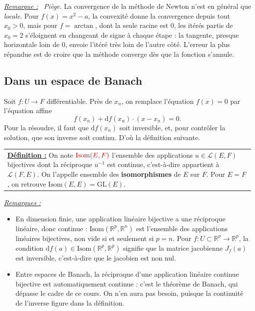 \documentclass[a4paper,twoside]{report}
\newcommand{\mot}[1]{\textcolor{rougecours}{\textbf{#1}}}
\newcommand{\rmath}[1]{\textcolor{rougecours}{#1}}
\newenvironment{remarque}%
 {\par\needspace{6\baselineskip}\vspace{1mm}\begin{list}{}{\leftmargin=1cm \rightmargin=0.5cm}\item[]%
  \textit{\underline{Remarque :}}~}%
 {\end{list}\vspace{1mm}}
\newenvironment{remarques}%
 {\par\needspace{6\baselineskip}\vspace{1mm}\begin{list}{}{\leftmargin=1cm \rightmargin=0.5cm}\item[]%
  \textit{\underline{Remarques :}}%
  \begin{itemize}[label=$\bullet$,leftmargin=0.45cm,topsep=3pt,itemsep=4pt]}%
 {\end{itemize}\end{list}\vspace{1mm}}
\newcommand{\R}{\mathbb{R}}
\newcommand{\dd}{\mathrm{d}}                      %
\newcommand{\GL}{\mathrm{GL}}                     %
\newcommand{\Lc}{\mathcal{L}}                     %
\newcommand{\Isom}{\mathrm{Isom}}                 %
\newcommand{\Jac}{J}                              %
\begin{document}
\begin{remarque}
\emph{Piège.} La convergence de la méthode de Newton n'est en général que \emph{locale}. Pour $f(x) = x^{2} - a$, la convexité donne la convergence depuis tout $x_{0} > 0$, mais pour $f = \arctan$, dont la seule racine est $0$, les itérés partis de $x_{0} = 2$ s'éloignent en changeant de signe à chaque étape : la tangente, presque horizontale loin de $0$, envoie l'itéré très loin de l'autre côté. L'erreur la plus répandue est de croire que la méthode converge dès que la fonction s'annule.
\end{remarque}

\subsection{Dans un espace de Banach}

Soit $f : U \to F$ différentiable. Près de $x_{n}$, on remplace l'équation $f(x) = 0$ par l'équation affine
\[ f(x_{n}) + \dd f(x_{n})\cdot(x - x_{n}) = 0. \]
Pour la résoudre, il faut que $\dd f(x_{n})$ soit inversible, et, pour contrôler la solution, que son inverse soit continu. D'où la définition suivante.

\begin{center}
\begin{tabularx}{15cm}{||X}
\noindent \textbf{\underline{Définition :}} On note $\rmath{\Isom(E, F)}$ l'ensemble des applications $u \in \Lc(E, F)$ bijectives dont la réciproque $u^{-1}$ est continue, c'est-à-dire appartient à $\Lc(F, E)$. On l'appelle ensemble des \mot{isomorphismes} de $E$ sur $F$. Pour $E = F$, on retrouve $\Isom(E, E) = \GL(E)$.
\end{tabularx}
\end{center}

\begin{remarques}
  \item En dimension finie, une application linéaire bijective a une réciproque linéaire, donc continue : $\Isom(\R^{p}, \R^{n})$ est l'ensemble des applications linéaires bijectives, non vide si et seulement si $p = n$. Pour $f : U \subset \R^{p} \to \R^{p}$, la condition $\dd f(a) \in \Isom(\R^{p}, \R^{p})$ signifie que la matrice jacobienne $\Jac_{f}(a)$ est inversible, c'est-à-dire que le jacobien est non nul.
  \item Entre espaces de Banach, la réciproque d'une application linéaire continue bijective est automatiquement continue : c'est le théorème de Banach, qui dépasse le cadre de ce cours. On n'en aura pas besoin, puisque la continuité de l'inverse figure dans la définition.
\end{remarques}
\end{document}
